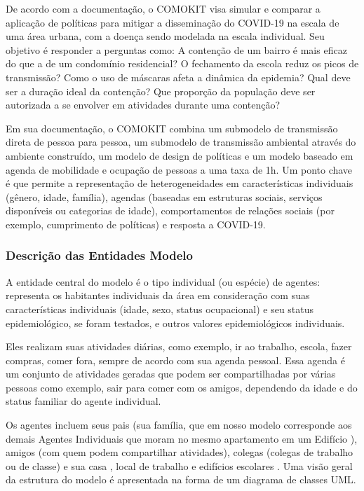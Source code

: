 De acordo com a documentação, o COMOKIT visa simular e comparar a aplicação de políticas para mitigar a disseminação do COVID-19 na escala de uma área urbana, com a doença sendo modelada na escala individual. Seu objetivo é responder a perguntas como: A contenção de um bairro é mais eficaz do que a de um condomínio residencial? O fechamento da escola reduz os picos de transmissão? Como o uso de máscaras afeta a dinâmica da epidemia? Qual deve ser a duração ideal da contenção? Que proporção da população deve ser autorizada a se envolver em atividades durante uma contenção? \cite{ODDCOMOKit32:online}

Em sua documentação, o COMOKIT combina um submodelo de transmissão direta de pessoa para pessoa, um submodelo de transmissão ambiental através do ambiente construído, um modelo de design de políticas e um modelo baseado em agenda de mobilidade e ocupação de pessoas a uma taxa de 1h. Um ponto chave é que permite a representação de heterogeneidades em características individuais (gênero, idade, família), agendas (baseadas em estruturas sociais, serviços disponíveis ou categorias de idade), comportamentos de relações sociais (por exemplo, cumprimento de políticas) e resposta a COVID-19. \cite{ArtigoComokit:online}


\subsubsection{Descrição das Entidades Modelo}

A entidade central do modelo é o tipo individual (ou espécie) de agentes: representa os habitantes individuais da área em consideração com suas características individuais (idade, sexo, status ocupacional) e seu status epidemiológico, se foram testados, e outros valores epidemiológicos individuais. \cite{ArtigoComokit:online}

Eles realizam suas atividades diárias, como exemplo, ir ao trabalho, escola, fazer compras, comer fora, sempre de acordo com sua agenda pessoal. Essa agenda é um conjunto de atividades geradas que podem ser compartilhadas por várias pessoas como exemplo, sair para comer com os amigos, dependendo da idade e do status familiar do agente individual. \cite{ArtigoComokit:online}

Os agentes incluem seus pais (sua família, que em nosso modelo corresponde aos demais Agentes Individuais que moram no mesmo apartamento em um Edifício ), amigos (com quem podem compartilhar atividades), colegas (colegas de trabalho ou de classe) e sua casa , local de trabalho e edifícios escolares . Uma visão geral da estrutura do modelo é apresentada na forma de um diagrama de classes UML. \cite{ArtigoComokit:online}


